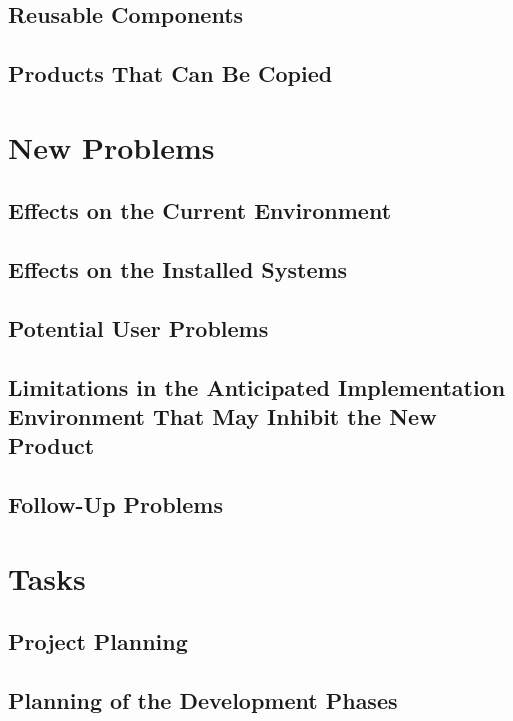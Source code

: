 \documentclass{scrreprt}
\begin{document}
\subsection{Reusable Components}

\subsection{Products That Can Be Copied}

\section{New Problems}

\subsection{Effects on the Current Environment}

\subsection{Effects on the Installed Systems}

\subsection{Potential User Problems}

\subsection{Limitations in the Anticipated Implementation Environment That May
            Inhibit the New Product}

\subsection{Follow-Up Problems}

\section{Tasks}

\subsection{Project Planning}

\subsection{Planning of the Development Phases}
\end{document}
